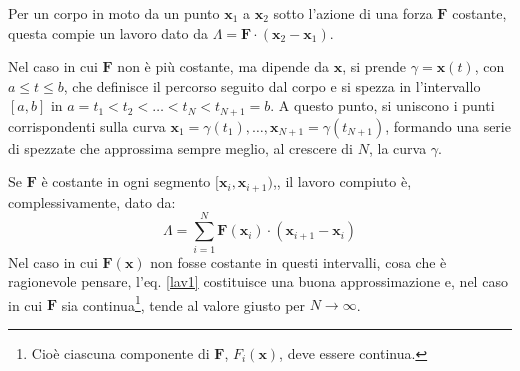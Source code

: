 \documentclass[10pt, a4paper]{scrartcl}
\theoremstyle{definition}
\numberwithin{esempio}{section}
\theoremstyle{definition}
\numberwithin{obs}{section}
\numberwithin{nota}{section}
\numberwithin{equation}{subsection}
\begin{document}
Per un corpo in moto da un punto $\mathbf{x} _1$ a $\mathbf{x} _2$ sotto l'azione di una forza $\mathbf{F} $ costante, questa compie un lavoro dato da $\Lambda = \mathbf{F} \cdot (\mathbf{x} _2 - \mathbf{x} _1)$.

Nel caso in cui $\mathbf{F} $ non \`e pi\`u costante, ma dipende da $\mathbf{x} $, si prende $\gamma = \mathbf{x} (t)$, con $a\le t\le b$, che definisce il percorso seguito dal corpo e si spezza in l'intervallo $[a,b]$ in $a = t_1 < t_2 < \ldots< t_N < t_{N+1} = b$. 
A questo punto, si uniscono i punti corrispondenti sulla curva $\mathbf{x} _1 = \gamma(t_1), \ldots, \mathbf{x} _{N+1}=\gamma(t_{N+1} ) $, formando una serie di spezzate che approssima sempre meglio, al crescere di $N$, la curva $\gamma$.

Se $\mathbf{F} $ \`e costante in ogni segmento $[\mathbf{x} _i, \mathbf{x} _{i+1} )$,, il lavoro compiuto \`e, complessivamente, dato da:
\begin{equation}\label{lav1}
	\Lambda = \sum_{i=1}^{N} \mathbf{F} (\mathbf{x} _i) \cdot (\mathbf{x} _{i+1} - \mathbf{x} _i)
\end{equation}
Nel caso in cui $\mathbf{F} (\mathbf{x} )$ non fosse costante in questi intervalli, cosa che \`e ragionevole pensare, l'eq. \ref{lav1} costituisce una buona approssimazione e, nel caso in cui $\mathbf{F} $ sia continua\footnote{Cio\`e ciascuna componente di $\mathbf{F} $, $F_i(\mathbf{x} )$, deve essere continua.}, tende al valore giusto per $N\to \infty$.
\end{document}
